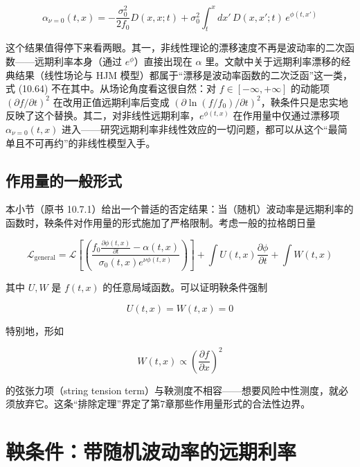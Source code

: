 \begin{equation*}
\alpha_{\nu=0}(t,x)=-\frac{\sigma_0^2}{2f_0}D(x,x;t)+\sigma_0^2\int_t^x dx'\,D(x,x';t)\,e^{\phi(t,x')}
\tag{10.65}
\end{equation*}

这个结果值得停下来看两眼。其一，非线性理论的漂移速度不再是波动率的二次函数——远期利率本身（通过 $e^{\phi}$）直接出现在 $\alpha$ 里。文献中关于远期利率漂移的经典结果（线性场论与 HJM 模型）都属于“漂移是波动率函数的二次泛函”这一类，式 (10.64) 不在其中。从场论角度看这很自然：对 $f\in[-\infty,+\infty]$ 的动能项 $(\partial f/\partial t)^2$ 在改用正值远期利率后变成 $(\partial\ln(f/f_0)/\partial t)^2$，鞅条件只是忠实地反映了这个替换。其二，对非线性远期利率，$e^{\phi(t,x)}$ 在作用量中仅通过漂移项 $\alpha_{\nu=0}(t,x)$ 进入——研究远期利率非线性效应的一切问题，都可以从这个“最简单且不可再约”的非线性模型入手。

\subsection{作用量的一般形式}

本小节（原书 10.7.1）给出一个普适的否定结果：当（随机）波动率是远期利率的函数时，鞅条件对作用量的形式施加了严格限制。考虑一般的拉格朗日量

\begin{equation*}
\mathcal{L}_{\text{general}}=\mathcal{L}\left[\left(\frac{f_0\frac{\partial\phi(t,x)}{\partial t}-\alpha(t,x)}{\sigma_0(t,x)e^{\nu\phi(t,x)}}\right)\right]+\int U(t,x)\frac{\partial\phi}{\partial t}+\int W(t,x)
\end{equation*}

其中 $U,W$ 是 $f(t,x)$ 的任意局域函数。可以证明鞅条件强制

\begin{equation*}
U(t,x)=W(t,x)=0
\end{equation*}

特别地，形如

\begin{equation*}
W(t,x)\propto\left(\frac{\partial f}{\partial x}\right)^2
\end{equation*}

的弦张力项（string tension term）与鞅测度不相容——想要风险中性测度，就必须放弃它。这条“排除定理”界定了第7章那些作用量形式的合法性边界。

\section{鞅条件：带随机波动率的远期利率}


